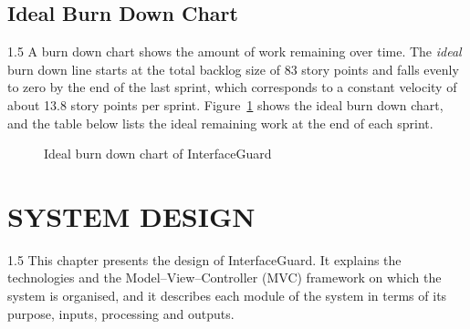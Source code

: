 \documentclass[12pt,a4paper]{article}
\begin{document}
\subsection{Ideal Burn Down Chart}

\begin{spacing}{1.5}
\justifying
A burn down chart shows the amount of work remaining over time. The
\emph{ideal} burn down line starts at the total backlog size of 83 story
points and falls evenly to zero by the end of the last sprint, which
corresponds to a constant velocity of about 13.8 story points per sprint.
Figure~\ref{fig:burndown} shows the ideal burn down chart, and the table
below lists the ideal remaining work at the end of each sprint.
\end{spacing}

\begin{figure}[H]
\centering
{}
\caption{Ideal burn down chart of InterfaceGuard}
\label{fig:burndown}
\end{figure}

\clearpage
 
\section{SYSTEM DESIGN}
 
\begin{spacing}{1.5}
\justifying
This chapter presents the design of InterfaceGuard. It explains the
technologies and the Model--View--Controller (MVC) framework on which the
system is organised, and it describes each module of the system in terms of
its purpose, inputs, processing and outputs.
\end{spacing}
 
\end{document}
